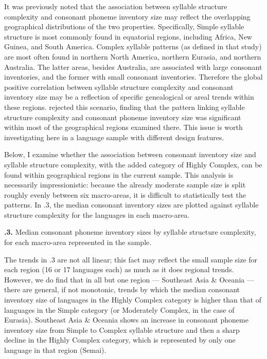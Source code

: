   It was previously noted that the association between syllable structure complexity and consonant phoneme inventory size may reflect the overlapping geographical distributions of the two properties. Specifically, Simple syllable structure is most commonly found in equatorial regions, including Africa, New Guinea, and South America. Complex syllable patterns (as defined in that study) are most often found in northern North America, northern Eurasia, and northern Australia. The latter areas, besides Australia, are associated with large consonant inventories, and the former with small consonant inventories. Therefore the global positive correlation between syllable structure complexity and consonant inventory size may be a reflection of specific genealogical or areal trends within these regions. \citet{Maddieson2006} rejected this scenario, finding that the pattern linking syllable structure complexity and consonant phoneme inventory size was significant within most of the geographical regions examined there. This issue is worth investigating here in a language sample with different design features.



  Below, I examine whether the association between consonant inventory size and syllable structure complexity, with the added category of Highly Complex, can be found within geographical regions in the current sample. This analysis is necessarily impressionistic: because the already moderate sample size is split roughly evenly between six macro-areas, it is difficult to statistically test the patterns. In .3, the median consonant inventory sizes are plotted against syllable structure complexity for the languages in each macro-area.





\textbf{.3.} Median consonant phoneme inventory sizes by syllable structure complexity, for each macro-area represented in the sample.



  The trends in .3 are not all linear; this fact may reflect the small sample size for each region (16 or 17 languages each) as much as it does regional trends. However, we do find that in all but one region — Southeast Asia \& Oceania — there are general, if not monotonic, trends by which the median consonant inventory size of languages in the Highly Complex category is higher than that of languages in the Simple category (or Moderately Complex, in the case of Eurasia). Southeast Asia \& Oceania shows an increase in consonant phoneme inventory size from Simple to Complex syllable structure and then a sharp decline in the Highly Complex category, which is represented by only one language in that region (Semai).



